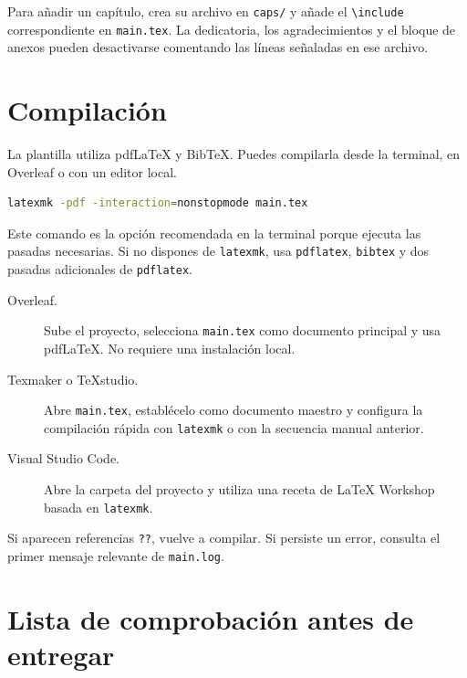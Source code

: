 Para añadir un capítulo, crea su archivo en \texttt{caps/} y añade el
\texttt{\textbackslash include} correspondiente en \texttt{main.tex}.
La dedicatoria, los agradecimientos y el bloque de anexos pueden desactivarse
comentando las líneas señaladas en ese archivo.

\section{Compilación}
\label{sec:compilacion}

La plantilla utiliza pdfLaTeX y BibTeX. Puedes compilarla desde la terminal,
en Overleaf o con un editor local.

\begin{lstlisting}[language=bash,caption={Compilación automática},label={lst:compilacion}]
latexmk -pdf -interaction=nonstopmode main.tex
\end{lstlisting}

Este comando es la opción recomendada en la terminal porque ejecuta las pasadas
necesarias. Si no dispones de \texttt{latexmk}, usa \texttt{pdflatex},
\texttt{bibtex} y dos pasadas adicionales de \texttt{pdflatex}.

\begin{description}
    \item[Overleaf.] Sube el proyecto, selecciona \texttt{main.tex} como
    documento principal y usa pdfLaTeX. No requiere una instalación local.
    \item[Texmaker o TeXstudio.] Abre \texttt{main.tex}, establécelo como
    documento maestro y configura la compilación rápida con \texttt{latexmk}
    o con la secuencia manual anterior.
    \item[Visual Studio Code.] Abre la carpeta del proyecto y utiliza una
    receta de LaTeX Workshop basada en \texttt{latexmk}.
\end{description}

Si aparecen referencias \texttt{??}, vuelve a compilar. Si persiste un error,
consulta el primer mensaje relevante de \texttt{main.log}.

\section{Lista de comprobación antes de entregar}
\label{sec:checklist-entrega}

